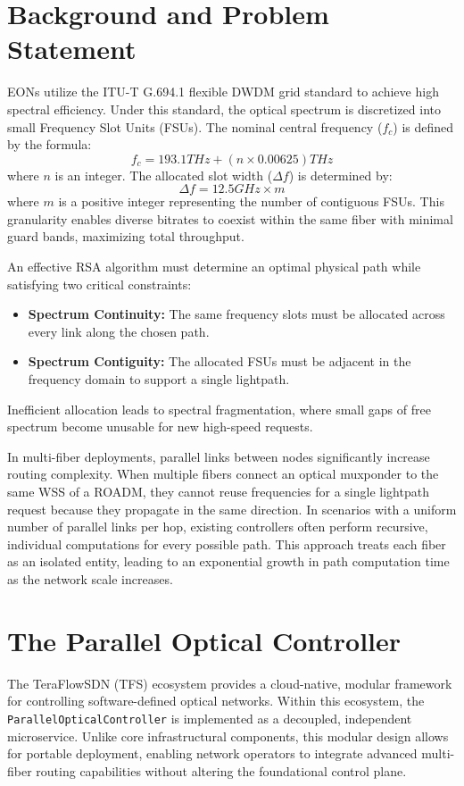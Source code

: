 \documentclass[conference]{IEEEtran}
\begin{document}
\section{Background and Problem Statement} %
EONs utilize the ITU-T G.694.1 flexible DWDM grid standard to achieve high spectral efficiency. Under this standard, the optical spectrum is discretized into small Frequency Slot Units (FSUs). The nominal central frequency ($f_c$) is defined by the formula:
\[
    f_c = 193.1 THz + (n \times 0.00625) THz
\]
where $n$ is an integer. The allocated slot width ($\Delta f$) is determined by:
\[
    \Delta f = 12.5 GHz \times m
\]
where $m$ is a positive integer representing the number of contiguous FSUs. This granularity enables diverse bitrates to coexist within the same fiber with minimal guard bands, maximizing total throughput.

An effective RSA algorithm must determine an optimal physical path while satisfying two critical constraints:
\begin{itemize}
    \item \textbf{Spectrum Continuity:} The same frequency slots must be allocated across every link along the chosen path.
    \item \textbf{Spectrum Contiguity:} The allocated FSUs must be adjacent in the frequency domain to support a single lightpath.
\end{itemize}
Inefficient allocation leads to spectral fragmentation, where small gaps of free spectrum become unusable for new high-speed requests.

In multi-fiber deployments, parallel links between nodes significantly increase routing complexity. When multiple fibers connect an optical muxponder to the same WSS of a ROADM, they cannot reuse frequencies for a single lightpath request because they propagate in the same direction. In scenarios with a uniform number of parallel links per hop, existing controllers often perform recursive, individual computations for every possible path. This approach treats each fiber as an isolated entity, leading to an exponential growth in path computation time as the network scale increases.
\section{The Parallel Optical Controller} %
The TeraFlowSDN (TFS) ecosystem provides a cloud-native, modular framework for controlling software-defined optical networks. Within this ecosystem, the \texttt{ParallelOpticalController} is implemented as a decoupled, independent microservice. Unlike core infrastructural components, this modular design allows for portable deployment, enabling network operators to integrate advanced multi-fiber routing capabilities without altering the foundational control plane.
\end{document}
